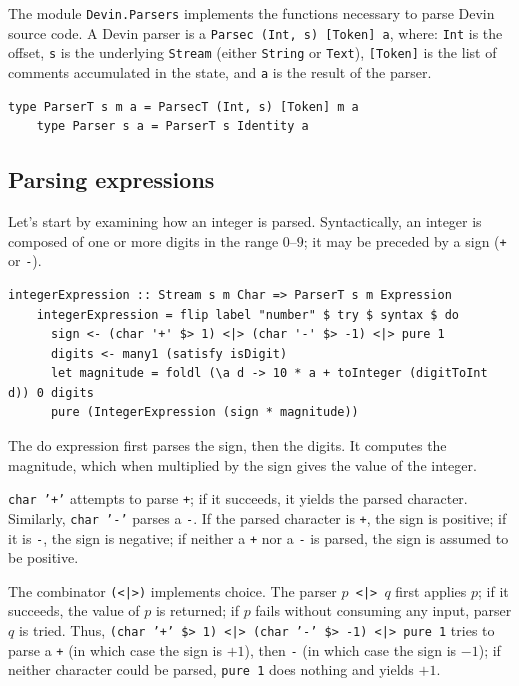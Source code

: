 \documentclass[UdineBachThesis,american,11pt]{PhdThesis}
\begin{document}
  \pagebreak

  The module \mbox{\texttt{Devin.Parsers}} implements the functions necessary to
  parse Devin source code. A Devin parser is a
  \mbox{\texttt{Parsec (Int, s) [Token] a}}, where: \mbox{\texttt{Int}} is the
  offset, \texttt{s} is the underlying \mbox{\texttt{Stream}} (either
  \mbox{\texttt{String}} or \mbox{\texttt{Text}}), \mbox{\texttt{[Token]}} is
  the list of comments accumulated in the state, and \texttt{a} is the result of
  the parser.

  \begin{Verbatim}[gobble=4,fontsize=\small]
    type ParserT s m a = ParsecT (Int, s) [Token] m a
    type Parser s a = ParserT s Identity a
  \end{Verbatim}

  \subsection{Parsing expressions}

  Let's start by examining how an integer is parsed. Syntactically, an integer
  is composed of one or more digits in the range \mbox{$0$--$9$}; it may be
  preceded by a sign (\texttt{+} or \texttt{-}).

  \begin{Verbatim}[gobble=4,fontsize=\small]
    integerExpression :: Stream s m Char => ParserT s m Expression
    integerExpression = flip label "number" $ try $ syntax $ do
      sign <- (char '+' $> 1) <|> (char '-' $> -1) <|> pure 1
      digits <- many1 (satisfy isDigit)
      let magnitude = foldl (\a d -> 10 * a + toInteger (digitToInt d)) 0 digits
      pure (IntegerExpression (sign * magnitude))
  \end{Verbatim}

  The do expression first parses the sign, then the digits. It computes the
  magnitude, which when multiplied by the sign gives the value of the integer.

  \mbox{\texttt{char '+'}} attempts to parse \texttt{+}; if it succeeds, it
  yields the parsed character. Similarly, \mbox{\texttt{char '-'}} parses a
  \texttt{-}. If the parsed character is \texttt{+}, the sign is positive; if it
  is \texttt{-}, the sign is negative; if neither a \texttt{+} nor a \texttt{-}
  is parsed, the sign is assumed to be positive.

  The combinator \mbox{\texttt{(<|>)}} implements choice. The parser
  \mbox{\texttt{$p$ <|> $q$}} first applies $p$; if it succeeds, the value of
  $p$ is returned; if $p$ fails without consuming any input, parser $q$ is
  tried. Thus, \mbox{\texttt{(char '+' \$> 1) <|> (char '-' \$> -1) <|> pure 1}}
  tries to parse a \texttt{+} (in which case the sign is \mbox{$+1$}), then
  \texttt{-} (in which case the sign is \mbox{$-1$}); if neither character could
  be parsed, \mbox{\texttt{pure 1}} does nothing and yields \mbox{$+1$}.
\end{document}
